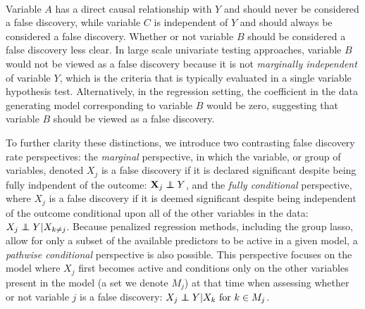 \begin{center}
 \\
\end{center}

Variable $A$ has a direct causal relationship with $Y$ and should never be considered a false discovery, while variable $C$ is independent of $Y$ and should always be considered a false discovery.  Whether or not variable $B$ should be considered a false discovery less clear.  In large scale univariate testing approaches, variable $B$ would not be viewed as a false discovery because it is not \textit{marginally independent} of variable $Y$, which is the criteria that is typically evaluated in a single variable hypothesis test.  Alternatively, in the regression setting, the coefficient in the data generating model corresponding to variable $B$ would be zero, suggesting that variable $B$ should be viewed as a false discovery.

To further clarity these distinctions, we introduce two contrasting false discovery rate perspectives: the \textit{marginal} perspective, in which the variable, or group of variables, denoted $X_j$ is a false discovery if it is declared significant despite being fully indpendent of the outcome: $\X_j \independent Y$, and the \textit{fully conditional} perspective, where $X_j$ is a false discovery if it is deemed significant despite being independent of the outcome conditional upon all of the other variables in the data: $X_j \independent Y | X_{k \neq j}$.  Because penalized regression methods, including the group lasso, allow for only a subset of the available predictors to be active in a given model, a \textit{pathwise conditional} perspective is also possible.  This perspective focuses on the model where $X_j$ first becomes active and conditions only on the other variables present in the model (a set we denote $M_j$) at that time when assessing whether or not variable $j$ is a false discovery: $X_j \independent Y | X_k \text{ for } k \in M_j$.

